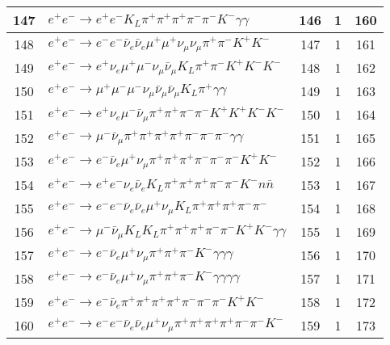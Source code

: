 \documentclass[landscape]{article}
\begin{document}
\begin{table}[htbp!]
\begin{tabular}{|c|>{\centering}p{18cm}|c|c|c|}
\hline
147 & $ e^{+} e^{-} \rightarrow e^{+} e^{-} K_{L} \pi^{+} \pi^{+} \pi^{+} \pi^{-} \pi^{-} K^{-} \gamma \gamma $ & 146 & 1 & 160 \\
\hline
148 & $ e^{+} e^{-} \rightarrow e^{-} e^{-} \bar{\nu}_{e} \bar{\nu}_{e} \mu^{+} \mu^{+} \nu_{\mu} \nu_{\mu} \pi^{+} \pi^{-} K^{+} K^{-} $ & 147 & 1 & 161 \\
\hline
149 & $ e^{+} e^{-} \rightarrow e^{+} \nu_{e} \mu^{+} \mu^{-} \nu_{\mu} \bar{\nu}_{\mu} K_{L} \pi^{+} \pi^{-} K^{+} K^{-} K^{-} $ & 148 & 1 & 162 \\
\hline
150 & $ e^{+} e^{-} \rightarrow \mu^{+} \mu^{-} \mu^{-} \nu_{\mu} \bar{\nu}_{\mu} \bar{\nu}_{\mu} K_{L} \pi^{+} \gamma \gamma $ & 149 & 1 & 163 \\
\hline
151 & $ e^{+} e^{-} \rightarrow e^{+} \nu_{e} \mu^{-} \bar{\nu}_{\mu} \pi^{+} \pi^{+} \pi^{-} \pi^{-} K^{+} K^{+} K^{-} K^{-} $ & 150 & 1 & 164 \\
\hline
152 & $ e^{+} e^{-} \rightarrow \mu^{-} \bar{\nu}_{\mu} \pi^{+} \pi^{+} \pi^{+} \pi^{+} \pi^{-} \pi^{-} \pi^{-} \gamma \gamma $ & 151 & 1 & 165 \\
\hline
153 & $ e^{+} e^{-} \rightarrow e^{-} \bar{\nu}_{e} \mu^{+} \nu_{\mu} \pi^{+} \pi^{+} \pi^{+} \pi^{-} \pi^{-} \pi^{-} K^{+} K^{-} $ & 152 & 1 & 166 \\
\hline
154 & $ e^{+} e^{-} \rightarrow e^{+} e^{-} \nu_{e} \bar{\nu}_{e} K_{L} \pi^{+} \pi^{+} \pi^{+} \pi^{-} \pi^{-} K^{-} n \bar{n} $ & 153 & 1 & 167 \\
\hline
155 & $ e^{+} e^{-} \rightarrow e^{-} e^{-} \bar{\nu}_{e} \bar{\nu}_{e} \mu^{+} \nu_{\mu} K_{L} \pi^{+} \pi^{+} \pi^{+} \pi^{-} \pi^{-} $ & 154 & 1 & 168 \\
\hline
156 & $ e^{+} e^{-} \rightarrow \mu^{-} \bar{\nu}_{\mu} K_{L} K_{L} \pi^{+} \pi^{+} \pi^{+} \pi^{-} \pi^{-} K^{+} K^{-} \gamma \gamma $ & 155 & 1 & 169 \\
\hline
157 & $ e^{+} e^{-} \rightarrow e^{-} \bar{\nu}_{e} \mu^{+} \nu_{\mu} \pi^{+} \pi^{+} \pi^{-} K^{-} \gamma \gamma \gamma $ & 156 & 1 & 170 \\
\hline
158 & $ e^{+} e^{-} \rightarrow e^{-} \bar{\nu}_{e} \mu^{+} \nu_{\mu} \pi^{+} \pi^{+} \pi^{-} K^{-} \gamma \gamma \gamma \gamma $ & 157 & 1 & 171 \\
\hline
159 & $ e^{+} e^{-} \rightarrow e^{-} \bar{\nu}_{e} \pi^{+} \pi^{+} \pi^{+} \pi^{+} \pi^{-} \pi^{-} \pi^{-} K^{+} K^{-} $ & 158 & 1 & 172 \\
\hline
160 & $ e^{+} e^{-} \rightarrow e^{-} e^{-} \bar{\nu}_{e} \bar{\nu}_{e} \mu^{+} \nu_{\mu} \pi^{+} \pi^{+} \pi^{+} \pi^{+} \pi^{-} \pi^{-} K^{-} $ & 159 & 1 & 173 \\
\hline
\end{tabular}
\end{table}
\end{document}
